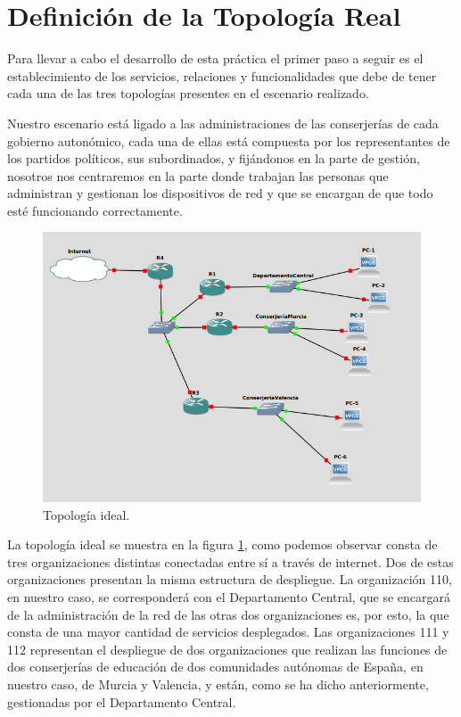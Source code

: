 \documentclass[a4paper]{article}
\begin{document}

\thispagestyle{empty}
\tableofcontents
\newpage


\section{Definición de la Topología Real}

Para llevar a cabo el desarrollo de esta práctica el primer paso a seguir es el establecimiento de los servicios, relaciones y funcionalidades que debe de tener cada una de las tres topologías presentes en el escenario realizado. 

 Nuestro escenario está ligado a las administraciones de las conserjerías de cada gobierno autonómico, cada una de ellas está compuesta por los representantes de los partidos políticos, sus subordinados, y fijándonos en la parte de gestión, nosotros nos centraremos en la parte donde trabajan las personas que administran y gestionan los dispositivos de red y que se encargan de que todo esté funcionando correctamente. 

\begin{figure}[h]
    \begin{center}
        \includegraphics[width=1\textwidth]{topo-ideal.png}
         \caption{Topología ideal.}
         \label{fig:topoideal}
    \end{center}
\end{figure}

\newpage La topología ideal se muestra en la figura \ref{fig:topoideal}, como podemos observar consta de tres organizaciones distintas conectadas entre sí a través de internet. Dos de estas organizaciones presentan la misma estructura de despliegue. 
La organización 110, en nuestro caso, se corresponderá con el Departamento Central, que se encargará de la administración de la red de las otras dos organizaciones es, por esto, la que consta de una mayor cantidad de servicios desplegados. Las organizaciones 111 y 112 representan el despliegue de dos organizaciones que realizan las funciones de dos conserjerías de educación de dos comunidades autónomas de España, en nuestro caso, de Murcia y Valencia, y están, como se ha dicho anteriormente, gestionadas por el Departamento Central.
\end{document}
